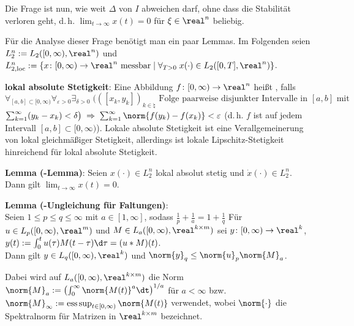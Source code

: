 Die Frage ist nun, wie weit $\Delta$ von $I$ abweichen darf, ohne dass die Stabilität verloren
geht, d.\,h. $\lim_{t \to \infty} x(t) = 0$ für $\xi \in \real^n$ beliebig.

\linie

Für die Analyse dieser Frage benötigt man ein paar Lemmas.
Im Folgenden seien\\
$L_2^n := L_2([0, \infty), \real^n)$ und
$L_{2,\loc}^n := \{x\colon [0, \infty) \rightarrow \real^n \text{ messbar} \;|\;
\forall_{T > 0}\; x(\cdot) \in L_2([0, T], \real^n)\}$.

\textbf{lokal absolute Stetigkeit}:
Eine Abbildung $f\colon [0, \infty) \rightarrow \real^n$ heißt
, falls\\
$\forall_{[a, b] \subset [0, \infty)} \forall_{\varepsilon > 0} \exists_{\delta > 0}\;
\big(([x_k, y_k])_{k \in \natural} \text{ Folge paarweise disjunkter Intervalle in }
[a, b] \text{ mit}$\\
$\sum_{k=1}^\infty (y_k - x_k) < \delta\big)
\;\Rightarrow\; \sum_{k=1}^\infty \norm{f(y_k) - f(x_k)} < \varepsilon$
(d.\,h. $f$ ist  auf jedem Intervall $[a, b] \subset [0, \infty)$).
Lokale absolute Stetigkeit ist eine Verallgemeinerung von lokal gleichmäßiger Stetigkeit,
allerdings ist lokale Lipschitz-Stetigkeit hinreichend für lokal absolute Stetigkeit.

\textbf{Lemma (-Lemma)}:
Seien $x(\cdot) \in L_2^n$ lokal absolut stetig und $\dot{x}(\cdot) \in L_2^n$.\\
Dann gilt $\lim_{t \to \infty} x(t) = 0$.

\textbf{Lemma (-Ungleichung für Faltungen)}:\\
Seien $1 \le p \le q \le \infty$ mit $a \in [1, \infty]$, sodass
$\frac{1}{p} + \frac{1}{a} = 1 + \frac{1}{q}$
Für $u \in L_p([0, \infty), \real^m)$ und $M \in L_a([0, \infty), \real^{k \times m})$
sei $y\colon [0, \infty) \rightarrow \real^k$,
$y(t) := \int_0^t u(\tau)M(t - \tau) \d\tau = (u \ast M)(t)$.\\
Dann gilt $y \in L_q([0, \infty), \real^k)$ und $\norm{y}_q \le \norm{u}_p \norm{M}_a$.

Dabei wird auf $L_a([0, \infty), \real^{k \times m})$
die Norm $\norm{M}_a := \left(\int_0^\infty \norm{M(t)}^a\dt\right)^{1/a}$ für $a < \infty$ bzw.\\
$\norm{M}_\infty := \esssup_{t \in [0, \infty)} \norm{M(t)}$ verwendet,
wobei $\norm{\cdot}$ die Spektralnorm für Matrizen in $\real^{k \times m}$ bezeichnet.

